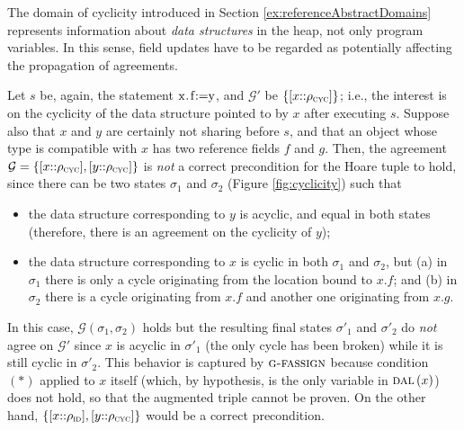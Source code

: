 \documentclass[prodmode,acmtocl]{acmsmall}
\def\state{\ensuremath{\sigma}\xspace}
\def\uco{\ensuremath{\rho}\xspace}
\newcommand{\0}{\mbox{\bf 0}}
\newcommand{\CODE}[1]{\ensuremath{\mbox{\lstinline!#1!}\xspace}\xspace}
\def\IDDOM{\ensuremath{\uco_{\textsc{id}}}\xspace}
\def\CYCLEDOM{\ensuremath{\uco_{\textsc{cyc}}}\xspace}
\def\AGREEM{\mathcal{G}}
\newcommand{\AGRS}[2]{[#2{::}#1]}
\newcommand{\GRULENAME}[1]{\textsc{g-#1}}
\newcommand{\DALIAS}[1]{\textsc{dal}\left(#1\right)}
\begin{document}
The domain of cyclicity introduced in Section
\ref{ex:referenceAbstractDomains} represents information about
\emph{data structures} in the heap, not only program variables.  In
this sense, field updates have to be regarded as potentially affecting
the propagation of agreements.

\begin{example}
  \label{ex:cyclicityDomain} Let $s$ be, again, the
  statement \CODE{x.f:=y}, and $\AGREEM'$ be $\{ \AGRS{\CYCLEDOM}{x}
  \}$; i.e., the interest is on the cyclicity of the data structure
  pointed to by $x$ after executing $s$.  Suppose also that $x$ and
  $y$ are certainly not sharing before $s$, and that an object whose
  type is compatible with $x$ has two reference fields $f$ and $g$.
  Then, the agreement $\AGREEM = \{
  \AGRS{\CYCLEDOM}{x},\AGRS{\CYCLEDOM}{y} \}$ is \emph{not} a correct
  precondition for the Hoare tuple to hold, since there can be two
  states $\state_1$ and $\state_2$ (Figure \ref{fig:cyclicity}) such
  that \begin{itemize} \item the data structure corresponding to $y$
    is acyclic, and equal in both states (therefore, there is an
    agreement on the cyclicity of $y$); \item the data structure
    corresponding to $x$ is cyclic in both $\state_1$ and $\state_2$,
    but (a) in $\state_1$ there is only a cycle originating from the
    location bound to $x.f$; and (b) in $\state_2$ there is a cycle
    originating from $x.f$ and another one originating from
    $x.g$.  \end{itemize} In this case, $\AGREEM(\state_1,\state_2)$
  holds but the resulting final states $\state'_1$ and $\state'_2$ do
  \emph{not} agree on $\AGREEM'$ since $x$ is acyclic in $\state'_1$
  (the only cycle has been broken) while it is still cyclic in
  $\state'_2$.  This behavior is captured by $\GRULENAME{fassign}$
  because condition $({*})$ applied to $x$ itself (which, by
  hypothesis, is the only variable in $\DALIAS{x}$) does not hold, so
  that the augmented triple cannot be proven.  On the other hand, $\{
  \AGRS{\IDDOM}{x},\AGRS{\CYCLEDOM}{y} \}$ would be a correct
  precondition.


\end{example}
\end{document}
